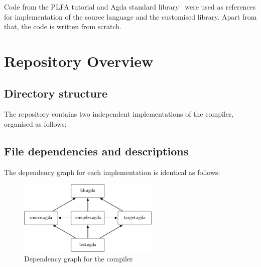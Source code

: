 \documentclass[12pt,twoside,a4paper]{report}
\theoremstyle{definition}
\theoremstyle{definition}
\theoremstyle{definition}
\theoremstyle{definition}
\begin{document}
    Code from the PLFA tutorial and Agda standard library~\cite{agda_std} were used as references for implementation of the source language and the customised library. Apart from that, the code is written from scratch.

    \section{Repository Overview}
        \subsection{Directory structure}
        The repository contains two independent implementations of the compiler, organised as follows:

        \subsection{File dependencies and descriptions}
        The dependency graph for each implementation is identical as follows:
        \begin{figure}[H]
            \centering
            \includegraphics[width=0.6\textwidth]{dependencies.pdf}
            \caption{Dependency graph for the compiler}
            \label{fig: dependencies}
        \end{figure}
\end{document}
